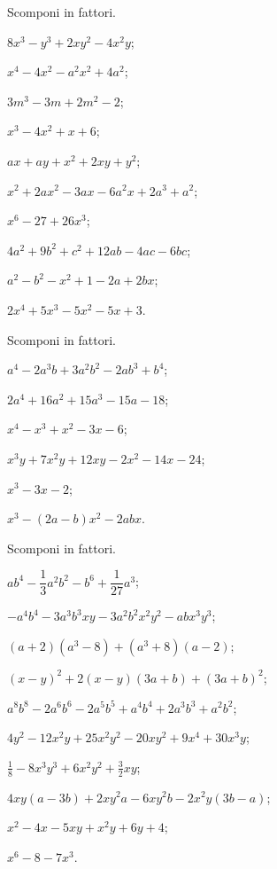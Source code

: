 \begin{esercizio}[\Ast]
 \label{ese:13.117}
 Scomponi in fattori.
 \begin{multicols}{2}
 \begin{enumeratea}
\item $8x^{3}-y^{3}+2xy^{2}-4x^{2}y$;
\item $x^{4}-4x^{2}-a^{2}x^{2}+4a^{2}$;
\item $3m^{3}-3m+2m^{2}-2$;
\item $x^{3}-4x^{2}+x+6$;
\item $ax+ay+x^{2}+2xy+y^{2}$;
\item $x^{2}+2ax^{2}-3ax-6a^{2}x+2a^{3}+a^{2}$;
\item $x^{6}-27+26x^{3}$;
\item $4a^{2}+9b^{2}+c^{2}+12ab-4ac-6bc$;
\item $a^{2}-b^{2}-x^{2}+1-2a+2bx$;
\item $2x^{4}+5x^{3}-5x^{2}-5x+3$.
 \end{enumeratea}
 \end{multicols}
\end{esercizio}

\begin{esercizio}[\Ast]
 \label{ese:13.118}
 Scomponi in fattori.
 \begin{multicols}{2}
 \begin{enumeratea}
\item $a^{4}-2a^{3}b+3a^{2}b^{2}-2ab^{3}+b^{4}$;
\item $2a^{4}+16a^{2}+15a^{3}-15a-18$;
\item $x^{4}-x^{3}+x^{2}-3x-6$;
\item $x^{3}y+7x^{2}y+12xy-2x^{2}-14x-24$;
\item $x^{3}-3x-2$;
\item $x^{3}-(2a-b)x^{2}-2abx$.
 \end{enumeratea}
 \end{multicols}
\end{esercizio}

\begin{esercizio}
 \label{ese:13.119}
 Scomponi in fattori.
 \begin{enumeratea}
\item $ab^{4}-\dfrac{1}{3}a^{2}b^{2}-b^{6}+\dfrac{1}{27}a^{3}$;
\item $-a^{4}b^{4}-3a^{3}b^{3}xy-3a^{2}b^{2}x^{2}y^{2}-abx^{3}y^{3}$;
\item $(a+2)\left(a^{3}-8\right)+\left(a^{3}+8\right)(a-2)$;
\item $(x-y)^{2}+2(x-y)(3a+b)+(3a+b)^{2}$;
\item $a^{8}b^{8}-2a^{6}b^{6}-2a^{5}b^{5}+a^{4}b^{4}+2a^{3}b^{3}+a^{2}b^{2}$;
\item $4y^{2}-12x^{2}y+25x^{2}y^{2}-20xy^{2}+9x^{4}+30x^{3}y$;
\item $\frac{1}{8}-8x^{3}y^{3}+6x^{2}y^{2}+\frac{3}{2}xy$;
\item $4xy(a-3b)+2xy^{2}a-6xy^{2}b-2x^{2}y(3b-a)$;
\item $x^{2}-4x-5xy+x^{2}y+6y+4$;
\item $x^{6}-8-7x^{3}$.
 \end{enumeratea}
\end{esercizio}

